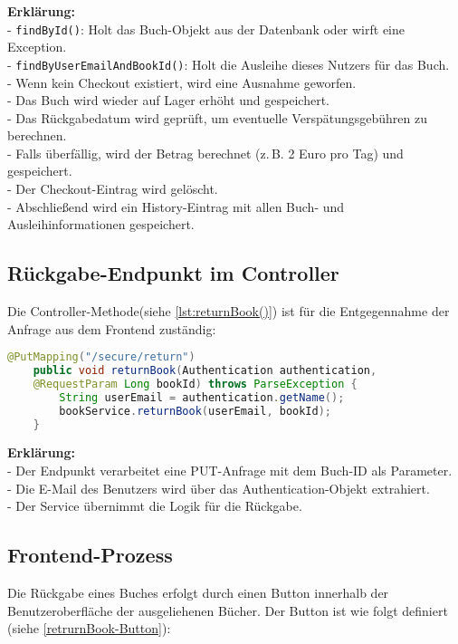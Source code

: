 \noindent \textbf{Erklärung:}\\
- \texttt{findById()}: Holt das Buch-Objekt aus der Datenbank oder wirft eine Exception.\\
- \texttt{findByUserEmailAndBookId()}: Holt die Ausleihe dieses Nutzers für das Buch.\\
- Wenn kein Checkout existiert, wird eine Ausnahme geworfen.\\
- Das Buch wird wieder auf Lager erhöht und gespeichert.\\
- Das Rückgabedatum wird geprüft, um eventuelle Verspätungsgebühren zu berechnen.\\
- Falls überfällig, wird der Betrag berechnet (z.\,B. 2 Euro pro Tag) und gespeichert.\\
- Der Checkout-Eintrag wird gelöscht.\\
- Abschließend wird ein History-Eintrag mit allen Buch- und Ausleihinformationen gespeichert.


\subsection*{Rückgabe-Endpunkt im Controller}

Die Controller-Methode(siehe  \ref{lst:returnBook()}) ist für die Entgegennahme der Anfrage aus dem Frontend zuständig:

\begin{lstlisting}[language=Java, caption=returnBook() Endpoint in BookController.java, label=lst:returnBook()]
	@PutMapping("/secure/return")
	public void returnBook(Authentication authentication,
	@RequestParam Long bookId) throws ParseException {
		String userEmail = authentication.getName();
		bookService.returnBook(userEmail, bookId);
	}
\end{lstlisting}

\noindent \textbf{Erklärung:}\\
- Der Endpunkt verarbeitet eine PUT-Anfrage mit dem Buch-ID als Parameter.\\
- Die E-Mail des Benutzers wird über das Authentication-Objekt extrahiert.\\
- Der Service übernimmt die Logik für die Rückgabe.

\subsection{Frontend-Prozess}
Die Rückgabe eines Buches erfolgt durch einen Button innerhalb der Benutzeroberfläche  der ausgeliehenen Bücher. Der Button ist wie folgt definiert (siehe \ref{retrurnBook-Button}):

